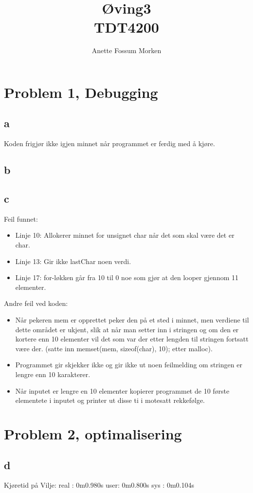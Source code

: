 \documentclass[12pt, a4paper]{article} %
\title{Øving3\\ TDT4200}
\author[1]{Anette Fossum Morken}
\date{}
\begin{document}
\maketitle
\section*{Problem 1, Debugging}
\subsection*{a}
Koden frigjør ikke igjen minnet når programmet er ferdig med å kjøre.

\subsection*{b}

\subsection*{c}
Feil funnet:
\begin{itemize}
\item Linje 10: Allokerer minnet for unsignet char når det som skal være det er char.
\item Linje 13: Gir ikke lastChar noen verdi.
\item Linje 17: for-løkken går fra 10 til 0 noe som gjør at den looper gjennom 11 elementer.
\end{itemize}
Andre feil ved koden:
\begin{itemize}
\item Når pekeren mem er opprettet peker den på et sted i minnet, men verdiene til dette området er ukjent, slik at når man setter inn i stringen og om den er kortere enn 10 elementer vil det som var der etter lengden til stringen fortsatt være der. (satte inn memset(mem, sizeof(char), 10); etter malloc).
\item Programmet gir skjekker ikke og gir ikke ut noen feilmelding om stringen er lengre enn 10 karakterer.
\item Når inputet er lengre en 10 elementer kopierer programmet de 10 første elementete i inputet og printer ut disse ti i motesatt rekkefølge.
\end{itemize}
\section*{Problem 2, optimalisering}

\subsection*{d}
Kjøretid på Vilje:
real :   0m0.980s
user:    0m0.800s
sys :    0m0.104s
\end{document}
